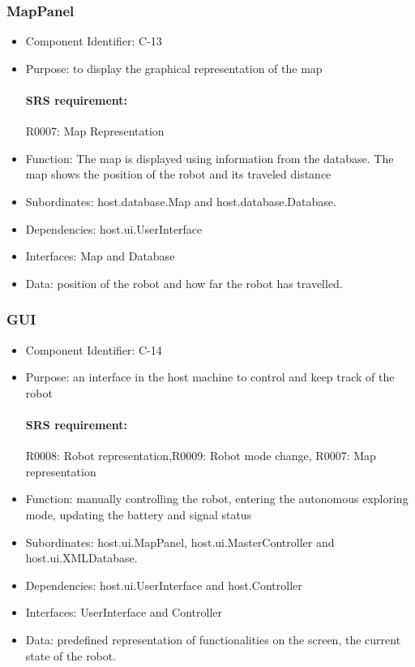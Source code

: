 \documentclass[11pt, a4paper]{report}
\begin{document}
\subsubsection{MapPanel}
\begin{itemize}
\item Component Identifier: C-13
\item Purpose: to display the graphical representation of the map
\paragraph{SRS requirement:} R0007: Map Representation
\item Function: The map is displayed using information from the database. The map shows
the position of the robot and its traveled distance
\item Subordinates: host.database.Map and host.database.Database.
\item Dependencies: host.ui.UserInterface
\item Interfaces: Map and Database
\item Data: position of the robot and how far the robot has travelled.
\end{itemize}
% 

\subsubsection{GUI}
\begin{itemize}
\item Component Identifier: C-14
\item Purpose: an interface in the host machine to control and keep track of the robot
\paragraph{SRS requirement:} R0008: Robot representation,R0009: Robot mode change,
R0007: Map representation
\item Function: manually controlling the robot, entering the autonomous exploring mode, updating
the battery and signal status
\item Subordinates: host.ui.MapPanel, host.ui.MasterController and host.ui.XMLDatabase. 
\item Dependencies: host.ui.UserInterface and host.Controller
\item Interfaces: UserInterface and Controller
\item Data: predefined representation of functionalities on the screen, the current state of the robot.
\end{itemize}
\end{document}
